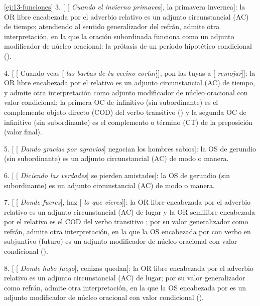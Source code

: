 \begin{solucion}{\ref{ej:13-funciones}}
3. [ [ \textit{Cuando el invierno primavea}], la primavera
invernea]: la OR libre encabezada por el adverbio relativo  es un
adjunto circunstancial (AC) de tiempo; atendiendo al sentido generalizador del
refrán, admite otra interpretación, en la que la oración subordinada funciona
como un adjunto modificador de núcleo oracional: la prótasis de un período
hipotético condicional ().

4. [ [ Cuando veas [ \textit{las barbas de tu
vecino cortar}]], pon las tuyas a [ \textit{remojar}]]: la OR libre
encabezada por el relativo  es un adjunto circunstancial (AC) de
tiempo, y admite otra interpretación como adjunto modificador de núcleo
oracional con valor condicional; la primera OC de infinitivo (sin subordinante)
es el complemento objeto directo (COD) del verbo transitivo 
() y la segunda OC de
infinitivo (sin subordinante) es el complemento o término (CT) de la preposición
 (valor final).

5. [ [ \textit{Dando gracias por agravios}] negocian los
hombres sabios]: la OS de gerundio (sin subordinante) es un adjunto
circunstancial (AC) de modo o manera.

6. [ [ \textit{Diciendo las verdades}] se pierden
amistades]: la OS de gerundio (sin subordinante) es un adjunto circunstancial
(AC) de modo o manera.

7. [ [ \textit{Donde fueres}], haz [
\textit{lo que vieres}]]: la OR libre encabezada por el adverbio relativo
 es un adjunto circunstancial (AC) de lugar y la OR semilibre
encabezada por el relativo  es el COD del verbo transitivo
; por su valor generalizador como refrán, admite otra
interpretación, en la que la OS encabezada por  con verbo en
subjuntivo (futuro) es un adjunto modificador de núcleo oracional con valor
condicional ().

8. [ [ \textit{Donde hubo fuego}], cenizas quedan]: la OR
libre encabezada por el adverbio relativo  es un adjunto
circunstancial (AC) de lugar; por su valor generalizador como refrán, admite otra
interpretación, en la que la OS encabezada por  es un adjunto
modificador de núcleo oracional con valor condicional ().


\end{solucion}
